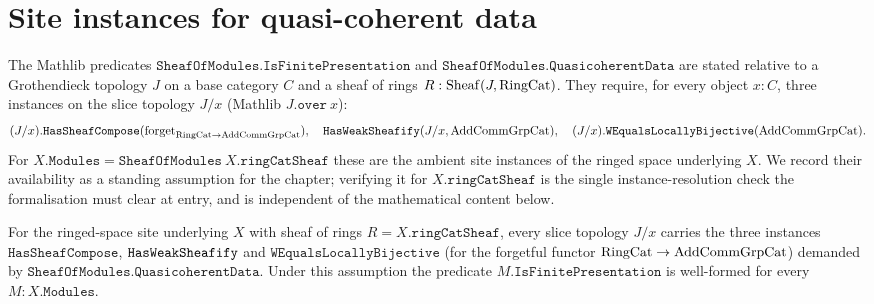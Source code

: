 \section{Site instances for quasi-coherent data}
\label{sec:lbc_site_instances}


The Mathlib predicates \(\mathtt{SheafOfModules.IsFinitePresentation}\) and
\(\mathtt{SheafOfModules.QuasicoherentData}\) are stated relative to a
Grothendieck topology \(J\) on a base category \(C\) and a sheaf of rings
\(R : \operatorname{Sheaf}(J, \mathrm{RingCat})\). They require, for every object \(x : C\), three
instances on the slice topology \(J/x\) (Mathlib \(J.\mathtt{over}\ x\)):
\[
  (J/x).\mathtt{HasSheafCompose}(\operatorname{forget}_{\mathrm{RingCat} \to \mathrm{AddCommGrpCat}}),\quad
  \mathtt{HasWeakSheafify}(J/x, \mathrm{AddCommGrpCat}),\quad
  (J/x).\mathtt{WEqualsLocallyBijective}(\mathrm{AddCommGrpCat}).
\]
For \(X.\mathtt{Modules} = \mathtt{SheafOfModules}\ X.\mathtt{ringCatSheaf}\)
these are the ambient site instances of the ringed space underlying \(X\). We
record their availability as a standing assumption for the chapter; verifying it
for \(X.\mathtt{ringCatSheaf}\) is the single instance-resolution check the
formalisation must clear at entry, and is independent of the mathematical
content below.

\begin{remark}
  \label{rem:lbc_site_instances}
  For the ringed-space site underlying \(X\) with sheaf of rings
  \(R = X.\mathtt{ringCatSheaf}\), every slice topology \(J/x\) carries the
  three instances \(\mathtt{HasSheafCompose}\), \(\mathtt{HasWeakSheafify}\) and
  \(\mathtt{WEqualsLocallyBijective}\) (for the forgetful functor
  \(\mathrm{RingCat} \to \mathrm{AddCommGrpCat}\)) demanded by
  \(\mathtt{SheafOfModules.QuasicoherentData}\). Under this assumption the
  predicate \(M.\mathtt{IsFinitePresentation}\) is well-formed for every
  \(M : X.\mathtt{Modules}\).
\end{remark}

